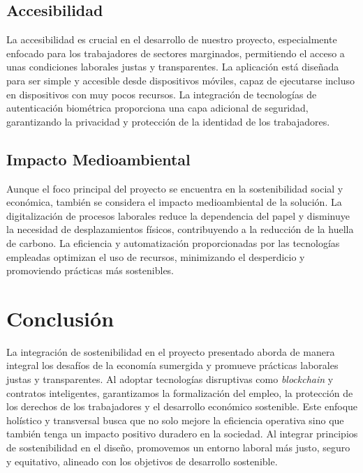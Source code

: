 \subsection{Accesibilidad}

La accesibilidad es crucial en el desarrollo de nuestro proyecto, especialmente enfocado para los trabajadores de sectores marginados, permitiendo el acceso a unas condiciones laborales justas y transparentes.
La aplicación está diseñada para ser simple y accesible desde dispositivos móviles, capaz de ejecutarse
incluso en dispositivos con muy pocos recursos.
La integración de tecnologías de autenticación biométrica proporciona una capa adicional de seguridad, garantizando la privacidad y protección de la identidad de los trabajadores. 


\subsection{Impacto Medioambiental}

Aunque el foco principal del proyecto se encuentra en la sostenibilidad social y económica, también se considera el impacto medioambiental de la solución. 
La digitalización de procesos laborales reduce la dependencia del papel y disminuye la necesidad de
desplazamientos físicos, contribuyendo a la reducción de la huella de carbono. La eficiencia y automatización proporcionadas por las tecnologías empleadas optimizan el uso de recursos, minimizando el desperdicio y promoviendo prácticas más sostenibles.

\section{Conclusión}

La integración de sostenibilidad en el proyecto presentado aborda de manera integral los desafíos de la economía sumergida y promueve prácticas laborales justas y transparentes. Al adoptar tecnologías disruptivas como \textit{blockchain} y contratos inteligentes, garantizamos la formalización del empleo, la protección de los derechos de los trabajadores y el desarrollo económico sostenible. 
Este enfoque holístico y transversal busca que no solo mejore la eficiencia operativa sino que también tenga un impacto positivo duradero en la sociedad. Al integrar principios de sostenibilidad en el diseño, promovemos un entorno laboral más justo, seguro y equitativo, alineado con los objetivos de desarrollo sostenible.